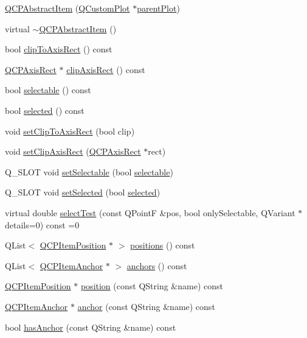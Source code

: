 \begin{DoxyCompactItemize}
\item 
\hyperlink{classQCPAbstractItem_a9922507d8b4503a1fe1ed0b1030e23b6}{Q\+C\+P\+Abstract\+Item} (\hyperlink{classQCustomPlot}{Q\+Custom\+Plot} $\ast$\hyperlink{classQCPLayerable_ab7e0e94461566093d36ffc0f5312b109}{parent\+Plot})
\item 
virtual \hyperlink{classQCPAbstractItem_a375bd1b7d3218b04a6ff7ff06fff917c}{$\sim$\+Q\+C\+P\+Abstract\+Item} ()
\item 
bool \hyperlink{classQCPAbstractItem_a5b0ea171823033bcb8aee81f4a034871}{clip\+To\+Axis\+Rect} () const 
\item 
\hyperlink{classQCPAxisRect}{Q\+C\+P\+Axis\+Rect} $\ast$ \hyperlink{classQCPAbstractItem_a37f86618740b5047eae23eedb2de061a}{clip\+Axis\+Rect} () const 
\item 
bool \hyperlink{classQCPAbstractItem_a9189e752025533e1595eaade0009a3bc}{selectable} () const 
\item 
bool \hyperlink{classQCPAbstractItem_a225865808640d8d9a7dd19f09a2e93f2}{selected} () const 
\item 
void \hyperlink{classQCPAbstractItem_a39e05b9d4176b9accafc746d16ca6a06}{set\+Clip\+To\+Axis\+Rect} (bool clip)
\item 
void \hyperlink{classQCPAbstractItem_a7dc75fcbcd10206fe0b75d757ea7a347}{set\+Clip\+Axis\+Rect} (\hyperlink{classQCPAxisRect}{Q\+C\+P\+Axis\+Rect} $\ast$rect)
\item 
Q\+\_\+\+S\+L\+OT void \hyperlink{classQCPAbstractItem_a8a8e32a55bc478b849756a78c2d87fd2}{set\+Selectable} (bool \hyperlink{classQCPAbstractItem_a9189e752025533e1595eaade0009a3bc}{selectable})
\item 
Q\+\_\+\+S\+L\+OT void \hyperlink{classQCPAbstractItem_a203de94ad586cc44d16c9565f49d3378}{set\+Selected} (bool \hyperlink{classQCPAbstractItem_a225865808640d8d9a7dd19f09a2e93f2}{selected})
\item 
virtual double \hyperlink{classQCPAbstractItem_a96d522d10ffc0413b9a366c6f7f0476b}{select\+Test} (const Q\+PointF \&pos, bool only\+Selectable, Q\+Variant $\ast$details=0) const =0
\item 
Q\+List$<$ \hyperlink{classQCPItemPosition}{Q\+C\+P\+Item\+Position} $\ast$ $>$ \hyperlink{classQCPAbstractItem_adf6a680cc29a6bce8345c3b6af3a91a1}{positions} () const 
\item 
Q\+List$<$ \hyperlink{classQCPItemAnchor}{Q\+C\+P\+Item\+Anchor} $\ast$ $>$ \hyperlink{classQCPAbstractItem_a8454b9941960b840608a5a1e00b1977d}{anchors} () const 
\item 
\hyperlink{classQCPItemPosition}{Q\+C\+P\+Item\+Position} $\ast$ \hyperlink{classQCPAbstractItem_af71345bd150f87fa1d2442837b87bb59}{position} (const Q\+String \&name) const 
\item 
\hyperlink{classQCPItemAnchor}{Q\+C\+P\+Item\+Anchor} $\ast$ \hyperlink{classQCPAbstractItem_abed974cba7cc02608c71dad4638e008d}{anchor} (const Q\+String \&name) const 
\item 
bool \hyperlink{classQCPAbstractItem_acbce9e5ba5252541d19db0c40303357a}{has\+Anchor} (const Q\+String \&name) const 
\end{DoxyCompactItemize}
